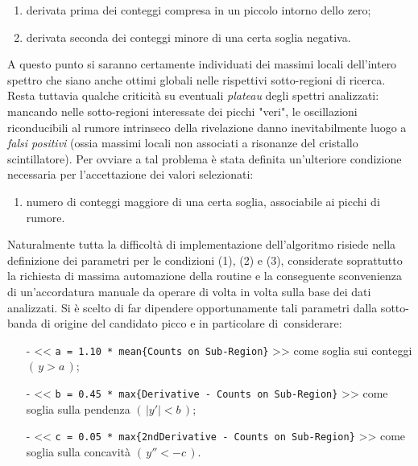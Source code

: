 \begin{enumerate}
\item derivata prima dei conteggi compresa in un piccolo intorno dello zero;
\item derivata seconda dei conteggi minore di una certa soglia negativa.
\setcounter{conditions}{\value{enumi}}
\end{enumerate}

\noindent A questo punto si saranno certamente individuati dei massimi locali dell'intero spettro che siano anche ottimi globali nelle rispettivi sotto-regioni di ricerca.\\

\noindent Resta tuttavia qualche criticità su eventuali \emph{plateau} degli spettri analizzati: mancando nelle sotto-regioni interessate dei picchi "veri", le oscillazioni riconducibili al rumore intrinseco della rivelazione danno inevitabilmente luogo a \emph{falsi positivi} (ossia massimi locali non associati a risonanze del cristallo scintillatore). Per ovviare a tal problema è stata definita un'ulteriore condizione necessaria per l'accettazione dei valori selezionati:

\begin{enumerate}
	\setcounter{enumi}{\value{conditions}}
	\item  numero di conteggi maggiore di una certa soglia, associabile ai picchi di rumore.
\end{enumerate}

\noindent Naturalmente tutta la difficoltà di implementazione dell'algoritmo risiede nella definizione dei parametri per le condizioni (1), (2) e (3), considerate soprattutto la richiesta di massima automazione della routine e la conseguente sconvenienza di un'accordatura manuale da operare di volta in volta sulla base dei dati analizzati. Si è scelto di far dipendere opportunamente tali parametri dalla sotto-banda di origine del candidato picco e in particolare di~considerare:

\begin{itemize}
	\item[-] << \texttt{a = 1.10 * mean\{Counts on Sub-Region\}} >> come soglia sui conteggi $(\,y > a\,)$;
	\item[-] << \texttt{b = 0.45 * max\{Derivative - Counts on Sub-Region\}} >> come soglia sulla pendenza $(\,|y'|<b\,)$;
	\item[-] << \texttt{c = 0.05 * max\{2ndDerivative - Counts on Sub-Region\}} >> come soglia sulla concavità $(\,y'' < -c\,)$.
\end{itemize}

